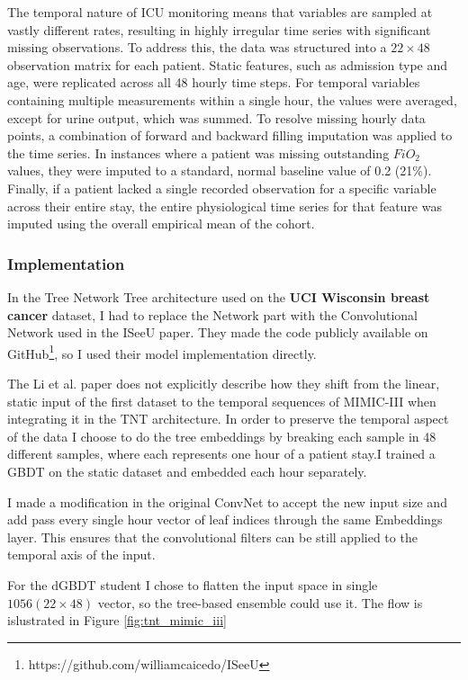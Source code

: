 The temporal nature of ICU monitoring means that variables are sampled at vastly different rates, resulting in highly irregular time series with significant missing observations. To address this, the data was structured into a $22\times48$ observation matrix for each patient.  Static features, such as admission type and age, were replicated across all 48 hourly time steps.  For temporal variables containing multiple measurements within a single hour, the values were averaged, except for urine output, which was summed.  To resolve missing hourly data points, a combination of forward and backward filling imputation was applied to the time series.  In instances where a patient was missing outstanding $FiO_{2}$ values, they were imputed to a standard, normal baseline value of 0.2 (21\%).  Finally, if a patient lacked a single recorded observation for a specific variable across their entire stay, the entire physiological time series for that feature was imputed using the overall empirical mean of the cohort.

\subsubsection{Implementation}
In the Tree Network Tree architecture used on the \textbf{UCI Wisconsin breast cancer} dataset, I had to replace the Network part with the Convolutional Network used in the ISeeU paper\cite{caicedo2019iseeu}. They made the code publicly available on GitHub\footnote{https://github.com/williamcaicedo/ISeeU}, so I used their model implementation directly.

The Li et al. paper\cite{li2020tnt} does not explicitly describe how they shift from the linear, static input of the first dataset to the temporal sequences of MIMIC-III when integrating it in the TNT architecture. In order to preserve the temporal aspect of the data I choose to do the tree embeddings by breaking each sample in 48 different samples, where each represents one hour of a patient stay.I trained a GBDT on the static dataset and embedded each hour separately.

I made a modification in the original ConvNet to accept the new input size and add pass every single hour vector of leaf indices through the same Embeddings layer. This ensures that the convolutional filters can be still applied to the temporal axis of the input.

For the dGBDT student I chose to flatten the input space in single $1056 (22\times48)$ vector, so the tree-based ensemble could use it. The flow is islustrated in Figure \ref{fig:tnt_mimic_iii}

